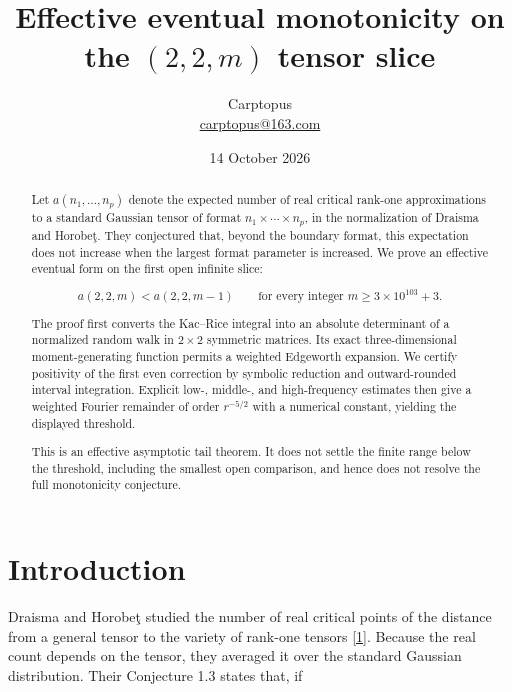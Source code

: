 \documentclass[11pt]{article}
\title{Effective eventual monotonicity on the $(2,2,m)$ tensor slice}
\author{Carptopus\\\href{mailto:carptopus@163.com}{carptopus@163.com}}
\date{14 October 2026}
\begin{document}
\maketitle
\begin{center}
\end{center}

\begin{abstract}

Let $a(n_1,\ldots,n_p)$ denote the expected number of real critical rank-one approximations to a standard Gaussian tensor of format $n_1\times\cdots\times n_p$, in the normalization of Draisma and Horobe\c{t}. They conjectured that, beyond the boundary format, this expectation does not increase when the largest format parameter is increased.  We prove an effective eventual form on the first open infinite slice:

\[
a(2,2,m)<a(2,2,m-1)
\qquad\text{for every integer }m\ge 3\times10^{103}+3.
\]

The proof first converts the Kac--Rice integral into an absolute determinant of a normalized random walk in $2\times2$ symmetric matrices.  Its exact three-dimensional moment-generating function permits a weighted Edgeworth expansion.  We certify positivity of the first even correction by symbolic reduction and outward-rounded interval integration.  Explicit low-, middle-, and high-frequency estimates then give a weighted Fourier remainder of order $r^{-5/2}$ with a numerical constant, yielding the displayed threshold.

This is an effective asymptotic tail theorem.  It does not settle the finite range below the threshold, including the smallest open comparison, and hence does not resolve the full monotonicity conjecture.

\end{abstract}

\section{Introduction}

Draisma and Horobe\c{t} studied the number of real critical points of the distance from a general tensor to the variety of rank-one tensors \hyperlink{ref1}{[1]}.  Because the real count depends on the tensor, they averaged it over the standard Gaussian distribution.  Their Conjecture 1.3 states that, if
\end{document}
